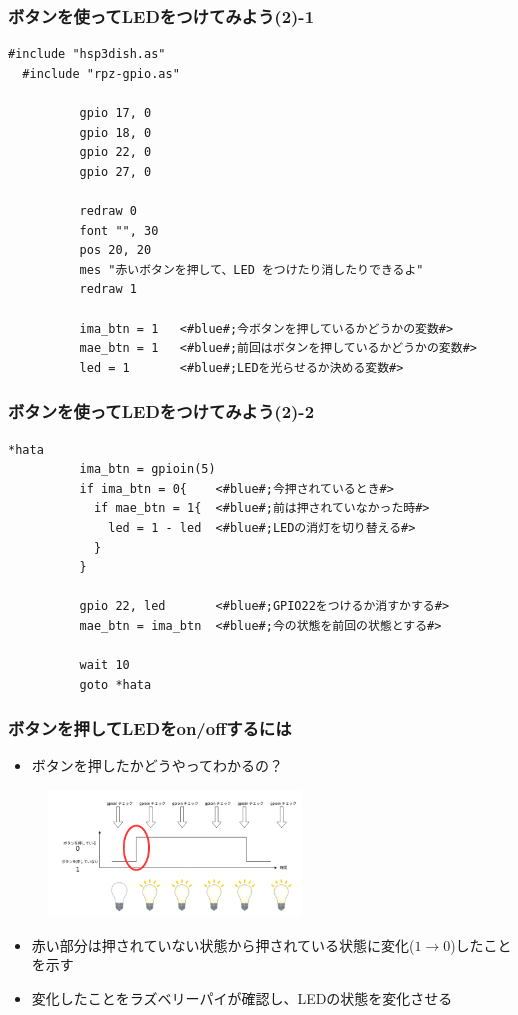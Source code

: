 \begin{frame}[fragile]
  \frametitle{ボタンを使ってLEDをつけてみよう(2)-1}
  \begin{lstlisting}[title=\sim/03/button\_led2.hsp 前半, label=button_led2.hsp-1]
  #include "hsp3dish.as"
  #include "rpz-gpio.as"
  
          gpio 17, 0
          gpio 18, 0
          gpio 22, 0
          gpio 27, 0
        
          redraw 0
          font "", 30
          pos 20, 20
          mes "赤いボタンを押して、LED をつけたり消したりできるよ"
          redraw 1

          ima_btn = 1   <#blue#;今ボタンを押しているかどうかの変数#>
          mae_btn = 1   <#blue#;前回はボタンを押しているかどうかの変数#>
          led = 1       <#blue#;LEDを光らせるか決める変数#>
  \end{lstlisting}
\end{frame}

\begin{frame}[fragile]
  \frametitle{ボタンを使ってLEDをつけてみよう(2)-2}
  \begin{lstlisting}[title=\sim/03/button\_led2.hsp 後半, label=button_led2.hsp-2]
  *hata
          ima_btn = gpioin(5)
          if ima_btn = 0{    <#blue#;今押されているとき#>
            if mae_btn = 1{  <#blue#;前は押されていなかった時#>
              led = 1 - led  <#blue#;LEDの消灯を切り替える#>
            }
          }

          gpio 22, led       <#blue#;GPIO22をつけるか消すかする#>
          mae_btn = ima_btn  <#blue#;今の状態を前回の状態とする#>

          wait 10
          goto *hata
  \end{lstlisting}
\end{frame}

\begin{frame}
  \frametitle{ボタンを押してLEDをon/offするには}
  \begin{itemize}
    \item ボタンを押したかどうやってわかるの？
  \end{itemize}
  \begin{figure}
    \centering
    \includegraphics[width=0.6\textwidth]{../images/chap03/button_push.png}
  \end{figure}
  \begin{itemize}
    \item 赤い部分は押されていない状態から押されている状態に変化($1\rightarrow0$)したことを示す
    \item 変化したことをラズベリーパイが確認し、LEDの状態を変化させる
  \end{itemize}
\end{frame}

